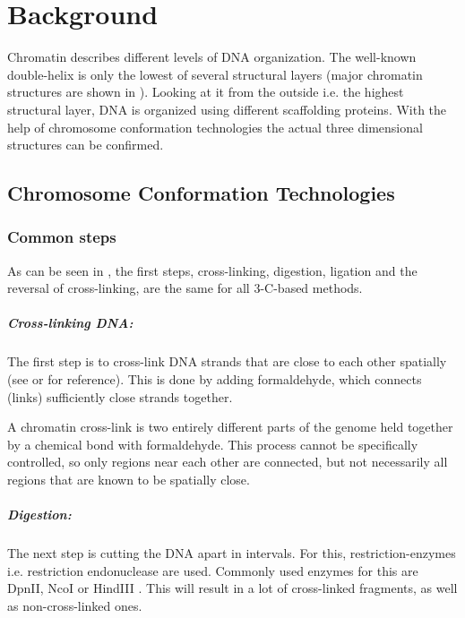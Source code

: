 \chapter{Background}\label{chap:background}



Chromatin describes different levels of DNA organization. The well-known
double-helix is only the lowest of several structural layers (major chromatin
structures are shown in ). Looking at it from the outside
i.e. the highest structural layer, DNA is organized using different scaffolding
proteins. With the help of chromosome conformation technologies the actual
three dimensional structures can be confirmed.


\section{Chromosome Conformation Technologies}\label{sec:cct}

\subsection{Common steps}\label{sec:common}

As can be seen in , the first steps, cross-linking, digestion,
ligation and the reversal of cross-linking, are the same for all 3-C-based methods.


\paragraph{Cross-linking DNA:}\label{sec:crosslinking}
The first step is to cross-link DNA strands that are close to each other
spatially (see  or  for reference). This is done by adding
formaldehyde, which connects (links) sufficiently close strands together.

A chromatin cross-link is two entirely different parts of the genome held
together by a chemical bond with formaldehyde. This process cannot be
specifically controlled, so only regions near each other are connected, but
not necessarily all regions that are known to be spatially close.


\paragraph{Digestion:}\label{sec:digestion}
The next step is cutting the DNA apart in intervals. For this,
restriction-enzymes i.e. restriction endonuclease are used. Commonly used
enzymes for this are DpnII, NcoI or HindIII \cite{lieberman2009comprehensive}.
This will result in a lot of cross-linked fragments, as well as
non-cross-linked ones.


